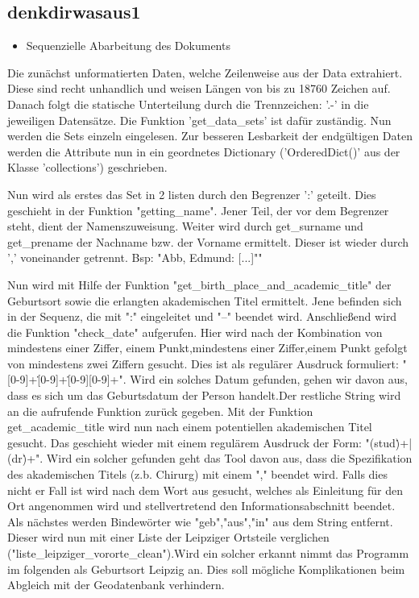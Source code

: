 \subsection{denkdirwasaus1}
 \label{subsec:denkdirwasaus1}

 \begin{itemize}
 \item Sequenzielle Abarbeitung des Dokuments
 \end {itemize}

 Die zunächst unformatierten Daten, welche Zeilenweise aus der Data extrahiert. Diese sind recht unhandlich und weisen Längen von bis zu 18760 Zeichen auf.
 Danach folgt die statische Unterteilung durch die Trennzeichen: '.-' in die jeweiligen Datensätze. Die Funktion 'get_data_sets' ist dafür zuständig.
 Nun werden die Sets einzeln eingelesen. Zur besseren Lesbarkeit der endgültigen Daten werden die Attribute nun in ein geordnetes Dictionary ('OrderedDict()' aus der Klasse 'collections') geschrieben.

 Nun wird als erstes das Set in 2 listen durch den Begrenzer ':' geteilt. Dies geschieht in der Funktion "getting_name". Jener Teil, der vor dem Begrenzer steht, dient der Namenszuweisung. Weiter wird durch get_surname und get_prename der Nachname bzw. der Vorname ermittelt. Dieser ist wieder durch ',' voneinander getrennt.
 Bsp: "Abb, Edmund: [...]""

 Nun wird mit Hilfe der Funktion "get_birth_place_and_academic_title" der Geburtsort sowie die erlangten akademischen Titel ermittelt. Jene befinden sich in der Sequenz, die mit ":" eingeleitet und "--" beendet wird.
 Anschließend wird die Funktion "check_date" aufgerufen. Hier wird nach der Kombination von mindestens einer Ziffer, einem Punkt,mindestens einer Ziffer,einem Punkt gefolgt von mindestens zwei Ziffern gesucht. Dies ist als regulärer Ausdruck formuliert: "[0-9]+\.[0-9]+\.[0-9][0-9]+". Wird ein solches Datum gefunden, gehen wir davon aus, dass es sich um das Geburtsdatum der Person handelt.Der restliche String wird an die aufrufende Funktion zurück gegeben.
 Mit der Funktion get_academic_title wird nun nach einem potentiellen akademischen Titel gesucht. Das geschieht wieder mit einem regulärem Ausdruck der Form: "(stud\.)+|(dr\.)+". Wird ein solcher gefunden geht das Tool davon aus, dass die Spezifikation des akademischen Titels (z.b. Chirurg) mit einem "," beendet wird. Falls dies nicht er Fall ist wird nach dem Wort aus gesucht, welches als Einleitung für den Ort angenommen wird und stellvertretend den Informationsabschnitt beendet.
 Als nächstes werden Bindewörter wie "geb","aus","in" aus dem String entfernt. Dieser wird nun mit einer Liste der Leipziger Ortsteile verglichen ("liste_leipziger_vororte_clean").Wird ein solcher erkannt nimmt das Programm im folgenden als Geburtsort Leipzig an. Dies soll mögliche Komplikationen beim Abgleich mit der Geodatenbank verhindern.

